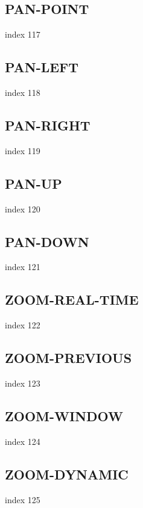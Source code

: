 \documentclass[11pt]{report}
\begin{document}
\subsection{PAN-POINT}

index 117

\subsection{PAN-LEFT}

index 118

\subsection{PAN-RIGHT}

index 119

\subsection{PAN-UP}

index 120

\subsection{PAN-DOWN}

index 121

\subsection{ZOOM-REAL-TIME}

index 122

\subsection{ZOOM-PREVIOUS}

index 123

\subsection{ZOOM-WINDOW}

index 124

\subsection{ZOOM-DYNAMIC}

index 125
\end{document}

